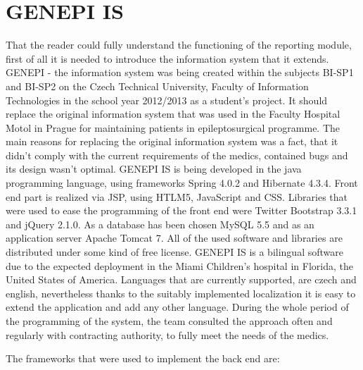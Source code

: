 \documentclass[thesis=B,english]{FITthesis}[2012/10/20]
\begin{document}
\section{GENEPI IS}
That the reader could fully understand the functioning of the reporting module, first of all it is needed to introduce the information system that it extends. GENEPI - the information system was being created within the subjects BI-SP1 and BI-SP2 on the Czech Technical University, Faculty of Information Technologies in the school year 2012/2013 as a student's project. It should replace the original information system that was used in the Faculty Hospital Motol in Prague for maintaining patients in epileptosurgical programme. The main reasons for replacing the original information system was a fact, that it didn't comply with the current requirements of the medics, contained bugs and its design wasn't optimal. GENEPI IS is being developed in the java programming language, using frameworks Spring 4.0.2 and Hibernate 4.3.4. Front end part is realized via JSP, using HTLM5, JavaScript and CSS. Libraries that were used to ease the programming of the front end were Twitter Bootstrap 3.3.1 and jQuery 2.1.0. As a database has been chosen MySQL 5.5 and as an application server Apache Tomcat 7. All of the used software and libraries are distributed under some kind of free license. GENEPI IS is a bilingual software due to the expected deployment in the Miami Children's hospital in Florida, the United States of America. Languages that are currently supported, are czech and english, nevertheless thanks to the suitably implemented localization it is easy to extend the application and add any other language. During the whole period of the programming of the system, the team consulted the approach often  and regularly with contracting authority, to fully meet the needs of the medics.

The frameworks that were used to implement the back end are: 
\end{document}
